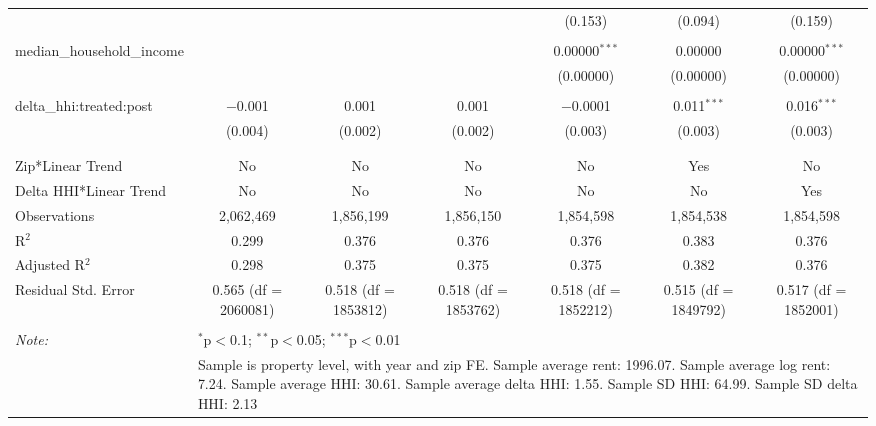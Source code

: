 \begin{table}[H]
{\begin{tabular}{@{\extracolsep{5pt}}lcccccc}
   &  &  &  & (0.153) & (0.094) & (0.159) \\  

   & & & & & & \\  

  median\_household\_income &  &  &  & 0.00000$^{***}$ & 0.00000 & 0.00000$^{***}$ \\  

   &  &  &  & (0.00000) & (0.00000) & (0.00000) \\  

   & & & & & & \\  

  delta\_hhi:treated:post & $-$0.001 & 0.001 & 0.001 & $-$0.0001 & 0.011$^{***}$ & 0.016$^{***}$ \\  

   & (0.004) & (0.002) & (0.002) & (0.003) & (0.003) & (0.003) \\  

   & & & & & & \\  

 \hline \\[-1.8ex]  

 Zip*Linear Trend & No & No & No & No & Yes & No \\  

 Delta HHI*Linear Trend & No & No & No & No & No & Yes \\  

 Observations & 2,062,469 & 1,856,199 & 1,856,150 & 1,854,598 & 1,854,538 & 1,854,598 \\  

 R$^{2}$ & 0.299 & 0.376 & 0.376 & 0.376 & 0.383 & 0.376 \\  

 Adjusted R$^{2}$ & 0.298 & 0.375 & 0.375 & 0.375 & 0.382 & 0.376 \\  

 Residual Std. Error & 0.565 (df = 2060081) & 0.518 (df = 1853812) & 0.518 (df = 1853762) & 0.518 (df = 1852212) & 0.515 (df = 1849792) & 0.517 (df = 1852001) \\  

 \hline  

 \hline \\[-1.8ex]  

 \textit{Note:}  & \multicolumn{6}{l}{$^{*}$p$<$0.1; $^{**}$p$<$0.05; $^{***}$p$<$0.01} \\  

  & \multicolumn{6}{l}{Sample is property level, with year and zip FE. Sample average rent: 1996.07. Sample average log rent: 7.24. Sample average HHI: 30.61. Sample average delta HHI: 1.55. Sample SD HHI: 64.99. Sample SD delta HHI: 2.13} \\  

 \end{tabular}}  

 \end{table}  

